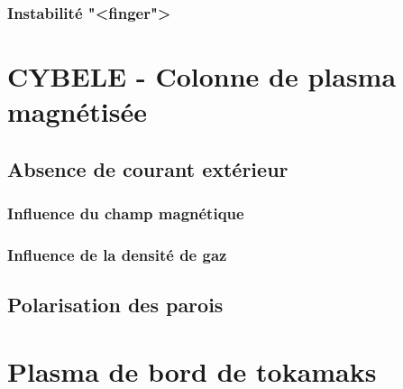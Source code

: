 \begin{refsection}
	\subsubsection{Instabilité "<finger">}
	
\section{CYBELE - Colonne de plasma magnétisée}
\subsection{Absence de courant extérieur}
	\subsubsection{Influence du champ magnétique}
	\subsubsection{Influence de la densité de gaz}
\subsection{Polarisation des parois}
		

\section{Plasma de bord de tokamaks}
%
%
\end{refsection}

